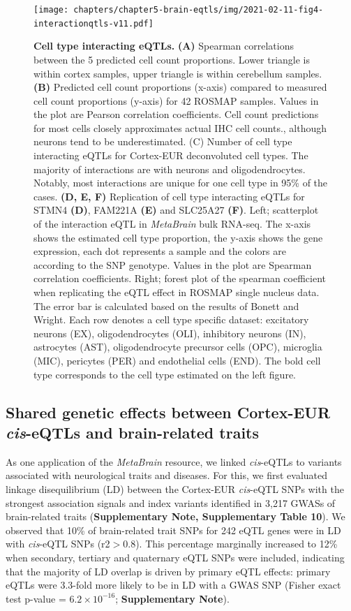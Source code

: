 \begin{figure}[H]
	\texttt{[image: chapters/chapter5-brain-eqtls/img/2021-02-11-fig4-interactionqtls-v11.pdf]}
	\caption{\textbf{Cell type interacting eQTLs.} \textbf{(A)} Spearman correlations between the 5 predicted cell count proportions. Lower triangle is within cortex samples, upper triangle is within cerebellum samples. \textbf{(B)} Predicted cell count proportions (x-axis) compared to measured cell count proportions (y-axis) for 42 ROSMAP samples. Values in the plot are Pearson correlation coefficients. Cell count predictions for most cells closely approximates actual IHC cell counts., although neurons tend to be underestimated. (C) Number of cell type interacting eQTLs for Cortex-EUR deconvoluted cell types. The majority of interactions are with neurons and oligodendrocytes. Notably, most interactions are unique for one cell type in 95\% of the cases. \textbf{(D, E, F)} Replication of cell type interacting eQTLs for STMN4 \textbf{(D)}, FAM221A \textbf{(E)} and SLC25A27 \textbf{(F)}. Left; scatterplot of the interaction eQTL in \textit{MetaBrain}  bulk RNA-seq. The x-axis shows the estimated cell type proportion, the y-axis shows the gene expression, each dot represents a sample and the colors are according to the SNP genotype. Values in the plot are Spearman correlation coefficients. Right; forest plot of the spearman coefficient when replicating the eQTL effect in ROSMAP single nucleus data. The error bar is calculated based on the results of Bonett and Wright\cite{bonettSampleSizeRequirements2000}. Each row denotes a cell type specific dataset: excitatory neurons (EX), oligodendrocytes (OLI), inhibitory neurons (IN), astrocytes (AST), oligodendrocyte precursor cells (OPC), microglia (MIC), pericytes (PER) and endothelial cells (END). The bold cell type corresponds to the cell type estimated on the left figure. }
	\label{metabrain_fig4}
\end{figure}

\subsection{Shared genetic effects between Cortex-EUR \textit{cis}-eQTLs and brain-related traits}

As one application of the \textit{MetaBrain} resource, we linked \textit{cis}-eQTLs to variants associated with neurological traits and diseases. For this, we first evaluated linkage disequilibrium (LD) between the Cortex-EUR \textit{cis}-eQTL SNPs with the strongest association signals and index variants identified in 3,217 GWASs of brain-related traits (\textbf{Supplementary Note, Supplementary Table 10}). We observed that 10\% of brain-related trait SNPs for 242 eQTL genes were in LD with \textit{cis}-eQTL SNPs (r2$>$0.8). This percentage marginally increased to 12\% when secondary, tertiary and quaternary eQTL SNPs were included, indicating that the majority of LD overlap is driven by primary eQTL effects: primary eQTLs were 3.3-fold more likely to be in LD with a GWAS SNP (Fisher exact test p-value = $6.2 \times 10^{-16}$; \textbf{Supplementary Note}). 


